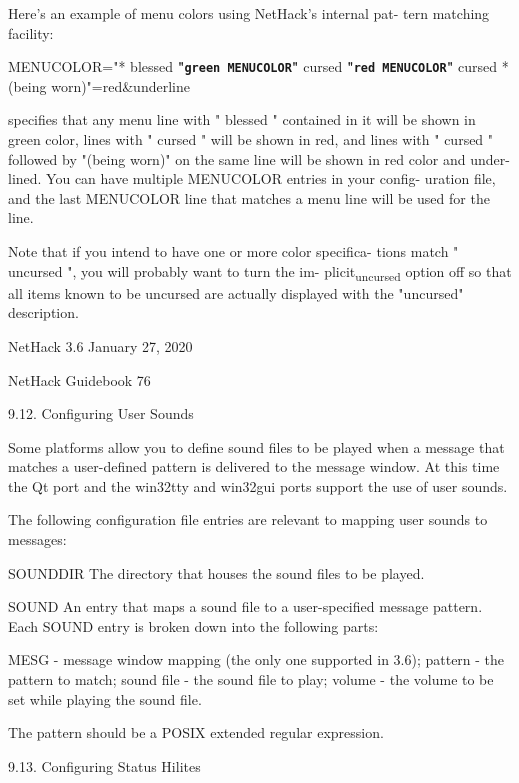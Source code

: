 \documentclass[11pt]{article}
\begin{document}
Here's an example of menu colors using NetHack's internal pat-
tern matching facility:

MENUCOLOR="* blessed \textbf{"\texttt{green
         MENUCOLOR}"} cursed \textbf{"\texttt{red
         MENUCOLOR}"} cursed *(being worn)"=red\&underline

specifies that any menu line with " blessed " contained in it
will be shown in green color, lines with " cursed " will be
shown in red, and lines with " cursed " followed by "(being
worn)" on the same line will be shown in red color and under-
lined. You can have multiple MENUCOLOR entries in your config-
uration file, and the last MENUCOLOR line that matches a menu
line will be used for the line.

   Note that if you intend to have one or more color specifica-
tions match " uncursed ", you will probably want to turn the im-
plicit\textsubscript{uncursed} option off so that all items known to be uncursed
are actually displayed with the "uncursed" description.





NetHack 3.6                   January 27, 2020





NetHack Guidebook                       76



9.12. Configuring User Sounds

   Some platforms allow you to define sound files to be played
when a message that matches a user-defined pattern is delivered
to the message window. At this time the Qt port and the win32tty
and win32gui ports support the use of user sounds.

   The following configuration file entries are relevant to
mapping user sounds to messages:

SOUNDDIR
 The directory that houses the sound files to be played.

SOUND
 An entry that maps a sound file to a user-specified message
 pattern.  Each SOUND entry is broken down into the following
 parts:

MESG    - message window mapping (the only one supported in
       3.6);
pattern  - the pattern to match;
sound file - the sound file to play;
volume   - the volume to be set while playing the sound file.

The pattern should be a POSIX extended regular expression.

9.13. Configuring Status Hilites
\end{document}
